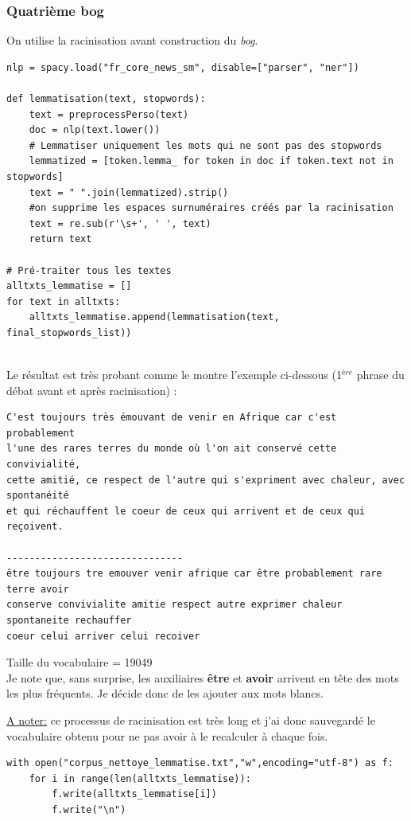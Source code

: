 \documentclass[a4paper,12pt]{article}
\begin{document}
\subsubsection{Quatrième bog}
On utilise la racinisation avant construction du \textit{bog}. 
\begin{lstlisting}
nlp = spacy.load("fr_core_news_sm", disable=["parser", "ner"]) 

def lemmatisation(text, stopwords):
    text = preprocessPerso(text)
    doc = nlp(text.lower())
    # Lemmatiser uniquement les mots qui ne sont pas des stopwords
    lemmatized = [token.lemma_ for token in doc if token.text not in stopwords]
    text = " ".join(lemmatized).strip()
    #on supprime les espaces surnuméraires créés par la racinisation
    text = re.sub(r'\s+', ' ', text)
    return text

# Pré-traiter tous les textes
alltxts_lemmatise = []
for text in alltxts:
    alltxts_lemmatise.append(lemmatisation(text, final_stopwords_list))
    
\end{lstlisting}

Le résultat est très probant comme le montre l'exemple ci-dessous (1$^{ère}$ phrase du débat avant et après racinisation) :

\begin{verbatim}
C'est toujours très émouvant de venir en Afrique car c'est probablement 
l'une des rares terres du monde où l'on ait conservé cette convivialité, 
cette amitié, ce respect de l'autre qui s'expriment avec chaleur, avec spontanéité 
et qui réchauffent le coeur de ceux qui arrivent et de ceux qui reçoivent.

-------------------------------
être toujours tre emouver venir afrique car être probablement rare terre avoir
conserve convivialite amitie respect autre exprimer chaleur spontaneite rechauffer 
coeur celui arriver celui recoiver
\end{verbatim}
Taille du vocabulaire =  19049\\

Je note que, sans surprise, les auxiliaires \textbf{être} et \textbf{avoir} arrivent en tête des mots les plus fréquents. Je décide donc de les ajouter aux mots blancs.

\underline{A noter:} ce processus de racinisation est très long et j'ai donc sauvegardé le vocabulaire obtenu pour ne pas avoir à le recalculer à chaque fois. 

\begin{lstlisting}
with open("corpus_nettoye_lemmatise.txt","w",encoding="utf-8") as f:
    for i in range(len(alltxts_lemmatise)):
        f.write(alltxts_lemmatise[i])
        f.write("\n")
\end{lstlisting}
\end{document}
